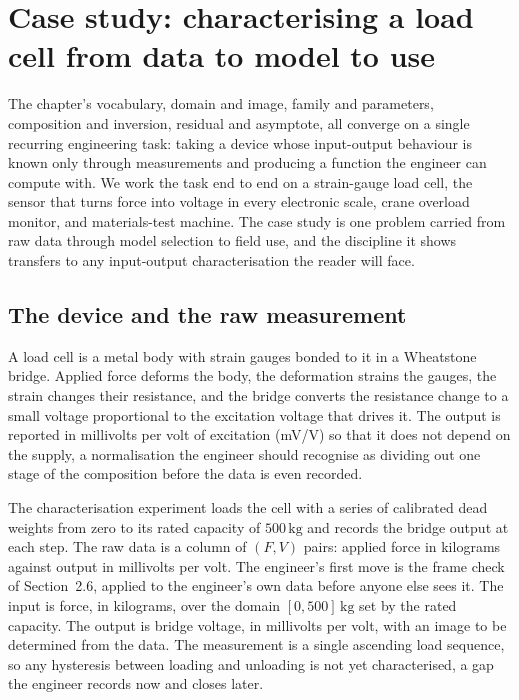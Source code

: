 \section{Case study: characterising a load cell from data to
model to use}

The chapter's vocabulary, domain and image, family and parameters,
composition and inversion, residual and asymptote, all converge on a
single recurring engineering task: taking a device whose input-output
behaviour is known only through measurements and producing a function
the engineer can compute with. We work the task end to end on a
strain-gauge load cell, the sensor that turns force into voltage in
every electronic scale, crane overload monitor, and materials-test
machine. The case study is one problem carried from raw data through
model selection to field use, and the discipline it shows transfers
to any input-output characterisation the reader will face.

\subsection{The device and the raw measurement}

A load cell is a metal body with strain gauges bonded to it in a
Wheatstone bridge. Applied force deforms the body, the deformation
strains the gauges, the strain changes their resistance, and the
bridge converts the resistance change to a small voltage proportional
to the excitation voltage that drives it. The output is reported in
millivolts per volt of excitation (\si{\milli\volt}/\si{\volt}) so
that it does not depend on the supply, a normalisation the engineer
should recognise as dividing out one stage of the composition before
the data is even recorded.

The characterisation experiment loads the cell with a series of
calibrated dead weights from zero to its rated capacity of
$500\,\si{\kilogram}$ and records the bridge output at each step. The
raw data is a column of $(F, V)$ pairs: applied force in kilograms
against output in millivolts per volt. The engineer's first move is
the frame check of Section~2.6, applied to the engineer's own data
before anyone else sees it. The input is force, in kilograms, over
the domain $[0, 500]\,\si{\kilogram}$ set by the rated capacity. The
output is bridge voltage, in millivolts per volt, with an image to be
determined from the data. The measurement is a single ascending load
sequence, so any hysteresis between loading and unloading is not yet
characterised, a gap the engineer records now and closes later.

